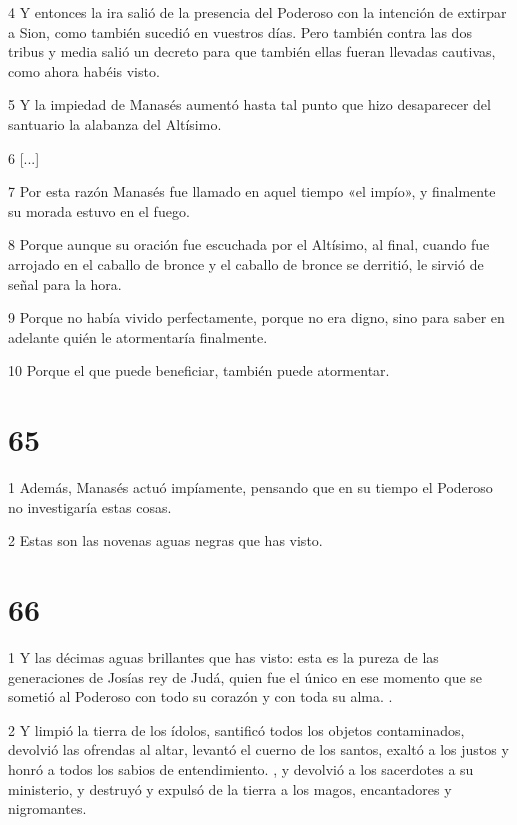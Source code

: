 \par 4 Y entonces la ira salió de la presencia del Poderoso con la intención de extirpar a Sion, como también sucedió en vuestros días. Pero también contra las dos tribus y media salió un decreto para que también ellas fueran llevadas cautivas, como ahora habéis visto.

\par 5 Y la impiedad de Manasés aumentó hasta tal punto que hizo desaparecer del santuario la alabanza del Altísimo.

\par 6 [...]

\par 7 Por esta razón Manasés fue llamado en aquel tiempo «el impío», y finalmente su morada estuvo en el fuego.

\par 8 Porque aunque su oración fue escuchada por el Altísimo, al final, cuando fue arrojado en el caballo de bronce y el caballo de bronce se derritió, le sirvió de señal para la hora.

\par 9 Porque no había vivido perfectamente, porque no era digno, sino para saber en adelante quién le atormentaría finalmente.

\par 10 Porque el que puede beneficiar, también puede atormentar.

\chapter{65}

\par 1 Además, Manasés actuó impíamente, pensando que en su tiempo el Poderoso no investigaría estas cosas.

\par 2 Estas son las novenas aguas negras que has visto.

\chapter{66}

\par 1 Y las décimas aguas brillantes que has visto: esta es la pureza de las generaciones de Josías rey de Judá, quien fue el único en ese momento que se sometió al Poderoso con todo su corazón y con toda su alma. .

\par 2 Y limpió la tierra de los ídolos, santificó todos los objetos contaminados, devolvió las ofrendas al altar, levantó el cuerno de los santos, exaltó a los justos y honró a todos los sabios de entendimiento. , y devolvió a los sacerdotes a su ministerio, y destruyó y expulsó de la tierra a los magos, encantadores y nigromantes.


